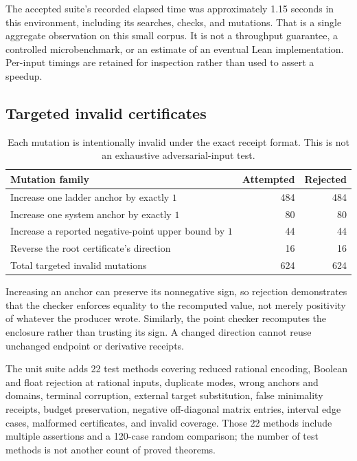 The accepted suite's recorded elapsed time was approximately 1.15 seconds in this environment, including its searches, checks, and mutations. That is a single aggregate observation on this small corpus. It is not a throughput guarantee, a controlled microbenchmark, or an estimate of an eventual Lean implementation. Per-input timings are retained for inspection rather than used to assert a speedup.

\subsection{Targeted invalid certificates}

\begin{table}[ht]
\centering
\begin{tabularx}{\textwidth}{@{}Xrr@{}}
\toprule
Mutation family & Attempted & Rejected\\
\midrule
Increase one ladder anchor by exactly $1$ & 484 & 484\\
Increase one system anchor by exactly $1$ & 80 & 80\\
Increase a reported negative-point upper bound by $1$ & 44 & 44\\
Reverse the root certificate's direction & 16 & 16\\
\midrule
Total targeted invalid mutations & 624 & 624\\
\bottomrule
\end{tabularx}
\caption{Each mutation is intentionally invalid under the exact receipt format. This is not an exhaustive adversarial-input test.}
\end{table}

Increasing an anchor can preserve its nonnegative sign, so rejection demonstrates that the checker enforces equality to the recomputed value, not merely positivity of whatever the producer wrote. Similarly, the point checker recomputes the enclosure rather than trusting its sign. A changed direction cannot reuse unchanged endpoint or derivative receipts.

The unit suite adds 22 test methods covering reduced rational encoding, Boolean and float rejection at rational inputs, duplicate modes, wrong anchors and domains, terminal corruption, external target substitution, false minimality receipts, budget preservation, negative off-diagonal matrix entries, interval edge cases, malformed certificates, and invalid coverage. Those 22 methods include multiple assertions and a 120-case random comparison; the number of test methods is not another count of proved theorems.

